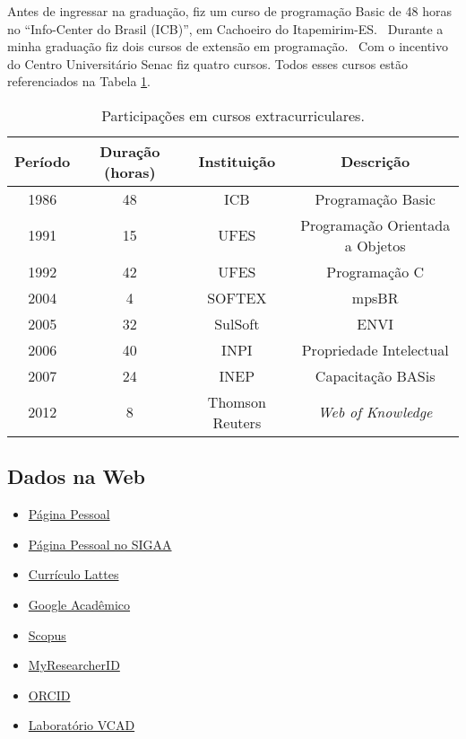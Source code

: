 Antes de ingressar na graduação, fiz um curso de programação Basic de 48 horas no ``Info-Center do Brasil (ICB)'', em Cachoeiro do Itapemirim-ES.
\
Durante a minha graduação fiz dois cursos de extensão em programação.
\
Com o incentivo do Centro Universitário Senac fiz quatro cursos. Todos esses cursos estão referenciados na Tabela \ref{tab:tabelaCursos}.

\begin{table}[!ht]
   \centering
   \caption{Participações em cursos extracurriculares.}\label{tab:tabelaCursos}
\begin{tabular}{|c|c|c|c|}
\hline
\textbf{Período} & \textbf{Duração (horas)} & \textbf{Instituição} & \textbf{Descrição} \\ \hline
  1986 & 48 &  ICB & Programação Basic \\ \hline
  1991 & 15 &  UFES & Programação Orientada a Objetos \\ \hline
  1992 & 42 &  UFES & Programação C \\ \hline
  2004 & 4 &  SOFTEX & mpsBR \\ \hline
  2005 & 32 &  SulSoft & ENVI \\ \hline
  2006 & 40 &  INPI & Propriedade Intelectual \\ \hline
  2007 & 24 &  INEP & Capacitação BASis \\ \hline
  2012 & 8  & Thomson Reuters & \textit{Web of Knowledge} \\ \hline
\end{tabular}
\end{table}

\subsection{Dados na Web}

\begin{itemize}
    \item \href{https://sites.google.com/site/fzampirolli}{Página Pessoal}
    \item \href{https://sig.ufabc.edu.br/sigaa/public/docente/portal.jsf?siape=1600876}{Página Pessoal no SIGAA}
    \item \href{http://lattes.cnpq.br/4127260763254001}{Currículo Lattes}
    \item \href{https://scholar.google.com.br/citations?hl=pt-BR&user=9jboxEoAAAAJ}{Google Acadêmico}
    \item \href{https://www.scopus.com/authid/detail.uri?authorId=56018682900}{Scopus}
    \item \href{https://www.webofscience.com/wos/author/record/D-2301-2012}{MyResearcherID}
    \item \href{https://orcid.org/0000-0002-7707-1793}{ORCID}
    \item \href{https://vcad-vision.ufabc.edu.br}{Laboratório VCAD}
\end{itemize}

